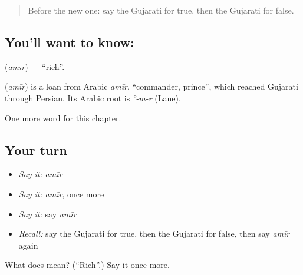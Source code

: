 \label{lesson:GU-C136-amir}



\begin{quote}
Before the new one: say the Gujarati for true, then the Gujarati for false.
\end{quote}

\subsection*{You'll want to know: }
\textbf{} (\emph{amīr}) — \textquotedblleft{}rich\textquotedblright{}.

\begin{cousinweb}
\textbf{} (\emph{amīr}) is a loan from Arabic \emph{amīr}, \textquotedblleft{}commander, prince\textquotedblright{}, which reached Gujarati through Persian. Its Arabic root is \emph{ʾ-m-r} (Lane).
\end{cousinweb}

\begin{grammarlens}[title={What you've built}]
One more word for this chapter.
\end{grammarlens}

\subsection*{Your turn}
\begin{itemize}
\raggedright
  \item \emph{Say it:} \emph{amīr}
  \item \emph{Say it:} \emph{amīr}, once more
  \item \emph{Say it:} say \emph{amīr}
  \item \emph{Recall:} say the Gujarati for true, then the Gujarati for false, then say \emph{amīr} again
\end{itemize}

\begin{tcolorbox}[breakable,colback=teal!4,colframe=teal!35!black,title={Before you move on}]
What does  mean? (\textquotedblleft{}Rich\textquotedblright{}.) Say it once more.
\end{tcolorbox}
